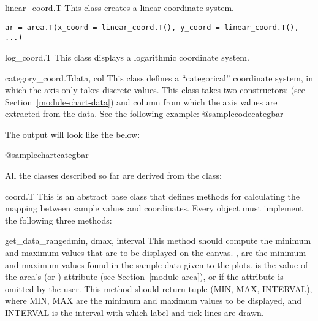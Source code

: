 \documentclass{howto}
\newcommand{\pxref}[1]{see Section~\ref{#1}}
\begin{document}
\begin{classdesc*}{linear_coord.T}
This class creates a linear coordinate system.

\begin{verbatim}
ar = area.T(x_coord = linear_coord.T(), y_coord = linear_coord.T(), ...)
\end{verbatim}
\end{classdesc*}

\begin{classdesc*}{log_coord.T}
This class displays a logarithmic coordinate system.
\end{classdesc*}

\begin{classdesc}{category_coord.T}{data, col}
This class defines a ``categorical'' coordinate system, in which the
axis only takes discrete values. This class takes two constructors:
 (\pxref{module-chart-data}) and column 
from which the axis values are
extracted from the data. See the following example:
@samplecode{categbar}

The output will look like the below:

@samplechart{categbar}
\end{classdesc}


All the classes described so far are derived from the  class:

\begin{classdesc}{coord.T}{}
This is an abstract base class that defines methods for
calculating the mapping between sample values and coordinates.
Every  object must implement the following three methods:
\end{classdesc}

\begin{methoddesc}{get_data_range}{dmin, dmax, interval}
This method should compute the minimum and maximum values that are to be
displayed on the canvas. , 
are the minimum and maximum values found
in the sample data given to the plots.  is the value of
the area's  (or )
attribute (\pxref{module-area}),
or  if the
attribute is omitted by the user. This method should return tuple
(MIN, MAX, INTERVAL), where MIN, MAX are the minimum and maximum values
to be displayed, and INTERVAL is the interval with which label and tick lines
are drawn.
\end{methoddesc}
\end{document}
